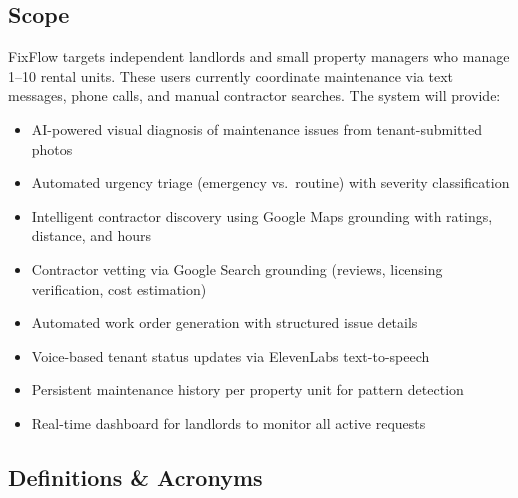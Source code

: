 \documentclass[12pt,a4paper]{article}
\begin{document}
\subsection{Scope}

FixFlow targets independent landlords and small property managers who manage 1--10 rental units. These users currently coordinate maintenance via text messages, phone calls, and manual contractor searches. The system will provide:

\begin{itemize}
    \item AI-powered visual diagnosis of maintenance issues from tenant-submitted photos
    \item Automated urgency triage (emergency vs.\ routine) with severity classification
    \item Intelligent contractor discovery using Google Maps grounding with ratings, distance, and hours
    \item Contractor vetting via Google Search grounding (reviews, licensing verification, cost estimation)
    \item Automated work order generation with structured issue details
    \item Voice-based tenant status updates via ElevenLabs text-to-speech
    \item Persistent maintenance history per property unit for pattern detection
    \item Real-time dashboard for landlords to monitor all active requests
\end{itemize}

\subsection{Definitions \& Acronyms}
\end{document}
